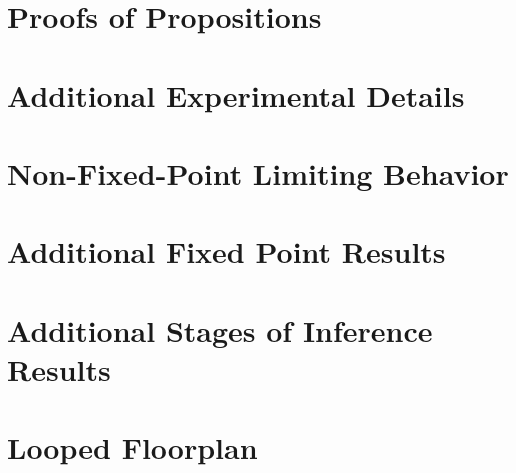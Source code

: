 

\newpage


% 

\section{Proofs of Propositions}


\section{Additional Experimental Details}\label{appen:experiment_details}



\FloatBarrier
\section{Non-Fixed-Point Limiting Behavior}\label{appen:orbits_and_sliders}


\FloatBarrier
\section{Additional Fixed Point Results}\label{appen:additional_fixed_point_results}


\FloatBarrier
\section{Additional Stages of Inference Results}\label{appen:additional_soi_results}



\FloatBarrier
\section{Looped Floorplan}

